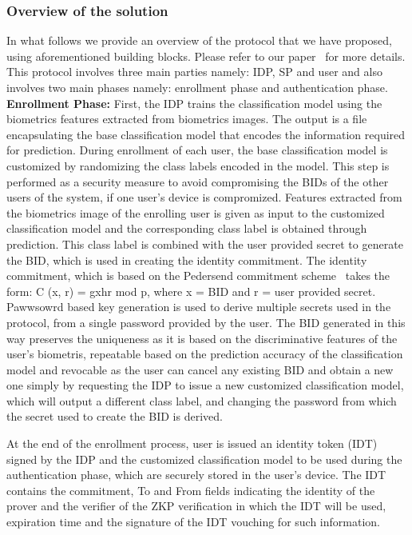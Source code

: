 \documentclass[10pt]{article}
\begin{document}
\subsubsection*{Overview of the solution}

In what follows we provide an overview of the protocol that we have proposed, using aforementioned building blocks. Please refer to our 
paper~\cite{ours} for more details. This protocol involves three main parties namely: IDP, SP and user and also involves two main phases namely: 
enrollment phase and authentication phase.\\

\textbf{Enrollment Phase:}
First, the IDP trains the classification model using the biometrics features extracted from biometrics images. The output is a 
file encapsulating the base classification model that encodes the information required for prediction. 
During enrollment of each user, the base classification model is customized by randomizing the class labels encoded in the 
model. This step is performed as a security measure to avoid compromising the BIDs of the other users of the system, if one user's device is 
compromized.
Features extracted from the biometrics image of the enrolling user is given as input to the customized classification model and the corresponding 
class label is obtained through prediction. This class label is combined with the user provided secret to generate the BID, which is used in creating 
the identity commitment. The identity commitment, which is based on the Pedersend commitment scheme~\cite{pedersenCommitment} takes the form: C (x, r) 
= gxhr mod p, where x = BID and r = user provided secret. Pawwsowrd based key generation is used to derive multiple secrets used in the 
protocol, from a single password provided by the user. The BID generated in this way preserves the uniqueness as it is based on the discriminative 
features of the user's biometris, repeatable based on the prediction accuracy of the classification model and revocable as the user can cancel any 
existing BID and obtain a new one simply by requesting the IDP to issue a new customized classification model, which will output a different class 
label, and changing the password from which the secret used to create the BID is derived.

At the end of the enrollment process, user is issued an identity token (IDT) signed by the IDP and the customized classification model to be used 
during the authentication phase, which are securely stored in the user's device. The IDT contains the commitment, To and From fields indicating the 
identity of the prover and the verifier of the ZKP verification in which the IDT will be used, expiration time and the signature of the IDT vouching 
for such information.
\end{document}
